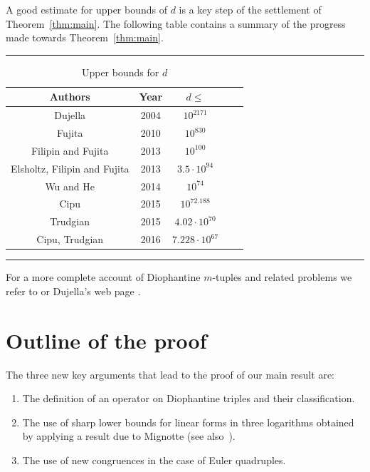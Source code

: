 \documentclass{amsart}
\theoremstyle{definition}
\begin{document}
 A good estimate for upper bounds of $d$ is a key step of the settlement of Theorem~\ref{thm:main}. The following table contains a summary of the progress made towards Theorem~\ref{thm:main}. 
 
 \begin{table}[!h] \label{tbl:2}
\begin{center}
\def\temptablewidth{0.72\textwidth}
{\rule{\temptablewidth}{1.1 pt}}
\begin{tabular*}{\temptablewidth}{@{\extracolsep{\fill}}ccccc}
 {\bf Authors} & {\bf Year} & {\bf $d\le$}   \\   \hline
   Dujella   \cite{Dujella:2004} & 2004  &$10^{2171} $    \\ \hline
  Fujita   \cite{Fujita-number} &  2010  &$10^{830}$   \\ \hline
  Filipin and Fujita  \cite{FF} & 2013  &$10^{100}$  \\ \hline
  Elsholtz, Filipin and Fujita \cite{EFF} & 2013 &$3.5\cdot 10^{94}$   \\ \hline
    Wu and He \cite{Wu-He:2014}  & 2014 & $10^{74}$ \\  \hline
  Cipu \cite{Cipu}  & 2015   &$10^{72.188}$  \\ \hline
  Trudgian \cite{Trudgian} & 2015 & $4.02\cdot 10^{70}$  \\ \hline
  Cipu, Trudgian \cite{Cipu-Trudgian} & 2016 & $7.228 \cdot 10^{67}$   
              \end{tabular*}
       {\rule{\temptablewidth}{1.1pt}}
       \end{center}
    \tabcolsep 0pt \caption{Upper bounds for $d$} \vspace*{-15pt}
       \end{table}  

For a more complete account of Diophantine $m$-tuples and related problems we refer to \cite{Dujella:2016} or Dujella's web page \cite{Dujella:HP}.

\section{Outline of the proof} \label{sec:2}

The three new key arguments that lead to the proof of our main result are:

\begin{enumerate}
\item The definition of an operator on Diophantine triples and their classification. 

\item The use of sharp lower bounds for linear forms in three logarithms obtained by applying
a result due to Mignotte \cite{Mignotte:kit} (see also~\cite{BMS1,BMS2}).

\item The use of new congruences in the case of Euler quadruples.    
\end{enumerate}
\end{document}
